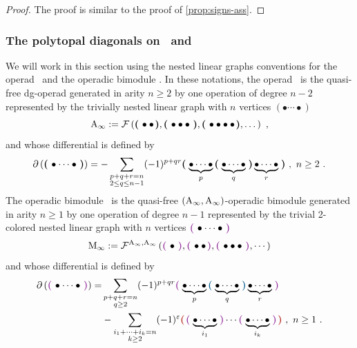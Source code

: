 \documentclass[twoside, 12pt]{amsart}
\theoremstyle{remark}
\begin{document}
\begin{proof}
  The proof is similar to the proof of \cref{prop:signs-ass}.
\end{proof}

\subsubsection{The polytopal diagonals on \Ainf\ and \Minf}

We will work in this section using the nested linear graphs conventions for the operad \Ainf\ and the operadic bimodule \Minf . In these notations, the operad \Ainf\ is the quasi-free dg-operad generated in arity $n \geq 2$ by one operation of degree $n-2$ represented by the trivially nested linear graph with $n$ vertices $(\bullet \cdots \bullet )$ 
\[ \mathrm{A}_\infty := \mathcal{F} \left( \boldsymbol{\left(\right.}  \bullet \bullet  \boldsymbol{\left.\right)} , \boldsymbol{\left(\right.}  \bullet \bullet \bullet  \boldsymbol{\left.\right)} ,  \boldsymbol{\left(\right.}  \bullet \bullet \bullet \bullet  \boldsymbol{\left.\right)} , \dots  \right) \ , \]
and whose differential is defined by
\[ \partial \left( \boldsymbol{\left(\right.}  \bullet \cdots \bullet  \boldsymbol{\left.\right)} \right) = - \sum_{\substack{p+q+r=n \\ 2 \leq q \leq n-1}} (-1)^{p+qr} \boldsymbol{\left(\right.}  \underbrace{\bullet \cdots \bullet}_p \boldsymbol{\left(\right.}  \underbrace{\bullet \cdots \bullet}_q  \boldsymbol{\left.\right)} \underbrace{\bullet \cdots \bullet}_r  \boldsymbol{\left.\right)} \ , \ n\geq 2 \ . \]
The operadic bimodule \Minf\ is the quasi-free $(\mathrm{A}_\infty , \mathrm{A}_\infty)$-operadic bimodule generated in arity $n \geq 1$ by one operation of degree $n-1$ represented by the trivial 2-colored nested linear graph with $n$ vertices $\purple{\bullet \cdots \bullet}$
\[ \Minf := \mathcal{F}^{\Ainf , \Ainf} \left( \purple{\bullet} , \purple{\bullet \bullet} , \purple{\bullet \bullet \bullet} , \cdots \right)\]
and whose differential is defined by
\begin{align*}
\partial \left( \purple{\bullet \cdots \bullet} \right) =& \sum_{\substack{p+q+r=n \\ q \geq 2}} (-1)^{p+qr} \purple{\underbrace{\bullet \cdots \bullet}_p \blue{\underbrace{\bullet \cdots \bullet}_q} \underbrace{\bullet \cdots \bullet}_r} \\
&-  \sum_{\substack{i_1+\cdots+i_k=n \\ k \geq 2}} (-1)^{\varepsilon} \red{\purple{\underbrace{\bullet \cdots \bullet}_{i_1}} \cdots \purple{\underbrace{\bullet \cdots \bullet}_{i_k}}} \ , \ n \geq 1 \ .
\end{align*} 
\end{document}
